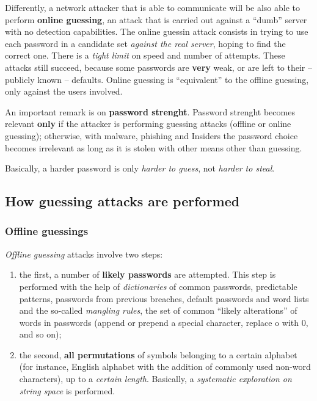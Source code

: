 \documentclass[10pt]{extbook}
\begin{document}
Differently, a network attacker that is able to communicate will be also able
to perform \textbf{online guessing}, an attack that is carried out against a
``dumb'' server with no detection capabilities. The online guessin attack
consists in trying to use each password in a candidate set \emph{against the
real server}, hoping to find the correct one. There is a \emph{tight limit} on
speed and number of attempts. These attacks still succeed, because some
passwords are \textbf{very} weak, or are left to their -- publicly known --
defaults. Online guessing is ``equivalent'' to the offline guessing, only
against the users involved.

An important remark is on \textbf{password strenght}. Password strenght becomes
relevant \textbf{only} if the attacker is performing guessing attacks (offline
or online guessing); otherwise, with malware, phishing and Insiders the
password choice becomes irrelevant as long as it is stolen with other means
other than guessing.

Basically, a harder password is only \emph{harder to guess}, not \emph{harder
to steal}.


\subsection{How guessing attacks are performed}

\subsubsection{Offline guessings}
\emph{Offline guessing} attacks involve two steps:
\begin{enumerate}
    \item the first, a number of \textbf{likely passwords} are attempted. This
        step is performed with the help of \emph{dictionaries} of common
        passwords, predictable patterns, passwords from previous breaches,
        default passwords and word lists and the so\--called \emph{mangling
        rules}, the set of common ``likely alterations'' of words in passwords
        (append or prepend a special character, replace o with 0, and so on);
    \item the second, \textbf{all permutations} of symbols belonging to a
        certain alphabet (for instance, English alphabet with the addition of
        commonly used non\--word characters), up to a \emph{certain length}.
        Basically, a \emph{systematic exploration on string space} is
        performed.
\end{enumerate}
\end{document}
